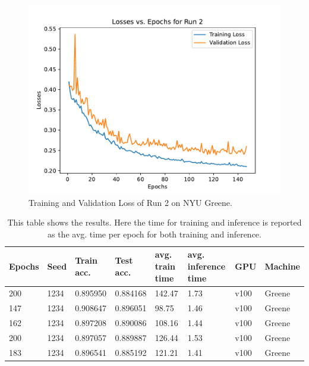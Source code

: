 \documentclass[sigplan,screen]{acmart}
\begin{document}
\begin{figure}[htb]
\centering\includegraphics[width=1.0\columnwidth]{images/epoch_vs_loss (2).pdf}
\caption{Training and Validation Loss of Run 2 on NYU Greene.}
\label{fig:Losses of Run 2}
\end{figure}



\begin{table}[thb]
    \centering
    \caption{This table shows the results. Here the time for training and inference is reported as the avg. time per epoch for both training and inference.}
    \begin{tabular}{|l|l|l|l|l|l|l|l|}
    \hline
        Epochs & Seed & Train acc. & Test acc.  & avg. train time  & avg. inference time & GPU & Machine\\ \hline
        200 & 1234 & 0.895950 & 0.884168 & 142.47 & 1.73 & v100 & Greene \\ \hline
        147 & 1234 & 0.908647 & 0.896051 & 98.75 & 1.46 & v100 & Greene\\ \hline
        162 & 1234 & 0.897208 & 0.890086 & 108.16 & 1.44 & v100 & Greene\\ \hline
        200 & 1234 & 0.897057 & 0.889887 & 126.44 & 1.53 & v100 & Greene\\ \hline
        183 & 1234 & 0.896541 & 0.885192 & 121.21 & 1.41 & v100 & Greene \\ \hline
    \end{tabular}
    \label{tab: Results}
\end{table}
\end{document}
